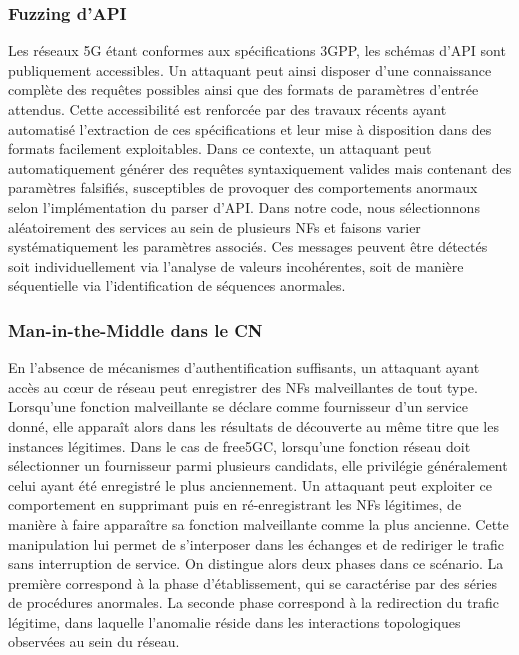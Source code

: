 \documentclass[a4paper,11pt,twoside]{StyleThese}
\begin{document}
\subsubsection{Fuzzing d’API}
Les réseaux 5G étant conformes aux spécifications 3GPP, les schémas d’API sont publiquement accessibles. Un attaquant peut ainsi disposer d’une connaissance complète des requêtes possibles ainsi que des formats de paramètres d'entrée attendus. Cette accessibilité est renforcée par des travaux récents \cite{api} ayant automatisé l’extraction de ces spécifications et leur mise à disposition dans des formats facilement exploitables. Dans ce contexte, un attaquant peut automatiquement générer des requêtes syntaxiquement valides mais contenant des paramètres falsifiés, susceptibles de provoquer des comportements anormaux selon l'implémentation du parser d'API. Dans notre code, nous sélectionnons aléatoirement des services au sein de plusieurs NFs et faisons varier systématiquement les paramètres associés. Ces messages peuvent être détectés soit individuellement via l’analyse de valeurs incohérentes, soit de manière séquentielle via l’identification de séquences anormales.

\subsubsection{Man-in-the-Middle dans le CN} 
En l’absence de mécanismes d’authentification suffisants, un attaquant ayant accès au cœur de réseau peut enregistrer des NFs malveillantes de tout type. Lorsqu’une fonction malveillante se déclare comme fournisseur d’un service donné, elle apparaît alors dans les résultats de découverte au même titre que les instances légitimes. Dans le cas de free5GC, lorsqu’une fonction réseau doit sélectionner un fournisseur parmi plusieurs candidats, elle privilégie généralement celui ayant été enregistré le plus anciennement. Un attaquant peut exploiter ce comportement en supprimant puis en ré-enregistrant les NFs légitimes, de manière à faire apparaître sa fonction malveillante comme la plus ancienne. Cette manipulation lui permet de s’interposer dans les échanges et de rediriger le trafic sans interruption de service. On distingue alors deux phases dans ce scénario. La première correspond à la phase d’établissement, qui se caractérise par des séries de procédures anormales. La seconde phase correspond à la redirection du trafic légitime, dans laquelle l'anomalie réside dans les interactions topologiques observées au sein du réseau.
\end{document}
